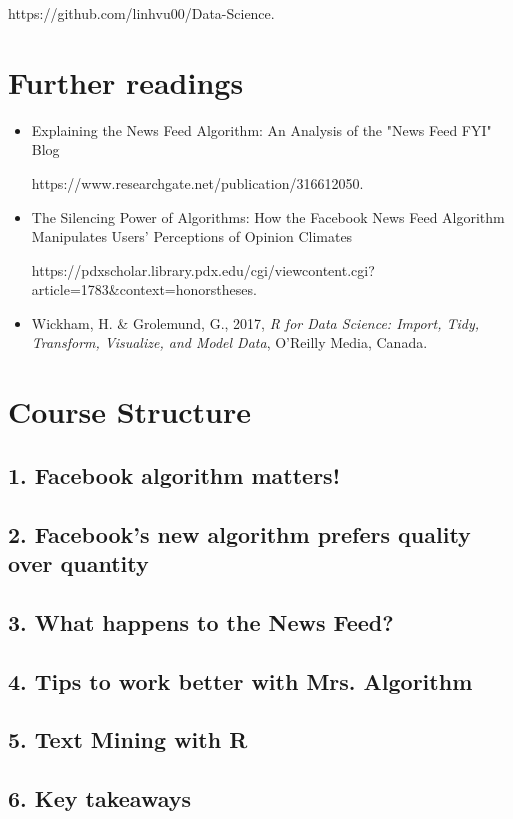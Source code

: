 \documentclass[11pt]{article}
\begin{document}
https://github.com/linhvu00/Data-Science.



\section*{Further readings}
\begin{itemize}
\item Explaining the News Feed Algorithm: An Analysis of the "News Feed FYI" Blog


https://www.researchgate.net/publication/316612050.
\item The Silencing Power of Algorithms: How the
Facebook News Feed Algorithm Manipulates Users’
Perceptions of Opinion Climates 

https://pdxscholar.library.pdx.edu/cgi/viewcontent.cgi?article=1783&context=honorstheses.
\item Wickham, H. & Grolemund, G., 2017, \emph{R for Data Science: Import, Tidy, Transform, Visualize, and Model Data}, O’Reilly Media, Canada.
\end{itemize}


\section*{Course Structure}
\subsection*{1. Facebook algorithm matters!}
\subsection*{2. Facebook's new algorithm prefers quality over quantity}
\subsection*{3. What happens to the News Feed?}
\subsection*{4. Tips to work better with Mrs. Algorithm}
\subsection*{5. Text Mining with R}
\subsection*{6. Key takeaways}
\end{document}
